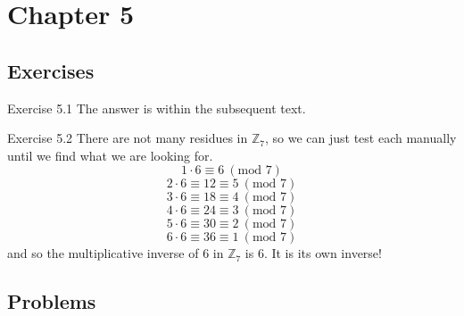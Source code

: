 \section{Chapter 5}
\subsection{Exercises} %
\begin{sol}{Exercise 5.1}
The answer is within the subsequent text.
\end{sol}
\begin{sol}{Exercise 5.2}
There are not many residues in $\mathbb{Z}_7$, so we can just test each manually until we find what we are looking for.
\[
1 \cdot 6 \equiv 6 ~(\text{mod }7)
\]
\[
2 \cdot 6 \equiv 12 \equiv 5 ~(\text{mod }7)
\]
\[
3 \cdot 6 \equiv 18 \equiv 4 ~(\text{mod }7)
\]
\[
4 \cdot 6 \equiv 24 \equiv 3 ~(\text{mod }7)
\]
\[
5 \cdot 6 \equiv 30 \equiv 2 ~(\text{mod }7)
\]
\[
6 \cdot 6 \equiv 36 \equiv 1 ~(\text{mod }7)
\]
and so the multiplicative inverse of $6$ in $\mathbb{Z}_7$ is 6. It is its own inverse!
\end{sol}

\subsection{Problems} %


